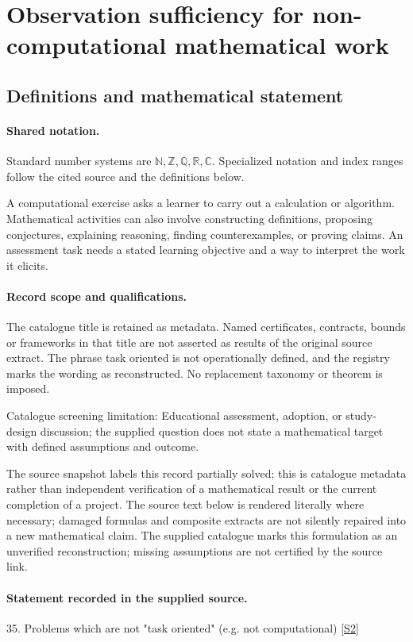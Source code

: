 \documentclass[11pt]{article}
\newcommand{\sref}[2]{\hyperlink{source:#1:#2}{[S#2]}}
\begin{document}
\section{Observation sufficiency for non-computational mathematical work}\label{statement}

\subsection{Definitions and mathematical statement}

\paragraph{Shared notation.}Standard number systems are $\mathbb N,\mathbb Z,\mathbb Q,\mathbb R,\mathbb C$. Specialized notation and index ranges follow the cited source and the definitions below.


A computational exercise asks a learner to carry out a calculation or algorithm. Mathematical activities can also involve constructing definitions, proposing conjectures, explaining reasoning, finding counterexamples, or proving claims. An assessment task needs a stated learning objective and a way to interpret the work it elicits.
\paragraph{Record scope and qualifications.}
The catalogue title is retained as metadata. Named certificates, contracts, bounds or frameworks in that title are not asserted as results of the original source extract.
The phrase task oriented is not operationally defined, and the registry marks the wording as reconstructed. No replacement taxonomy or theorem is imposed.

Catalogue screening limitation: Educational assessment, adoption, or study-design discussion; the supplied question does not state a mathematical target with defined assumptions and outcome.

The source snapshot labels this record partially solved; this is catalogue metadata rather than independent verification of a mathematical result or the current completion of a project.
The source text below is rendered literally where necessary; damaged formulas and composite extracts are not silently repaired into a new mathematical claim.
The supplied catalogue marks this formulation as an unverified reconstruction; missing assumptions are not certified by the source link.
\paragraph{Statement recorded in the supplied source.}
35. Problems which are not "task oriented" (e.g. not computational) \sref{statement}{2}
\end{document}
